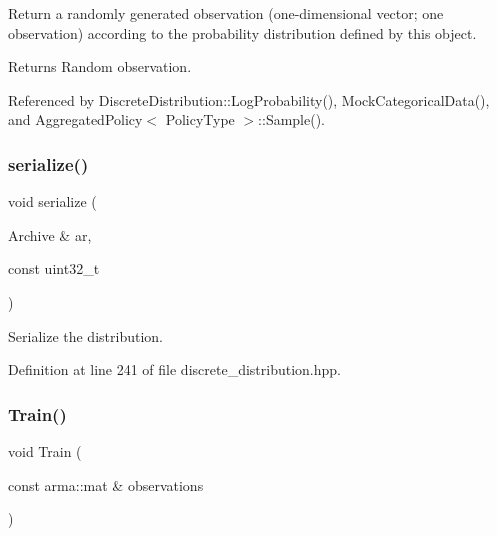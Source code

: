 Return a randomly generated observation (one-\/dimensional vector; one observation) according to the probability distribution defined by this object. 

\begin{DoxyReturn}{Returns}
Random observation. 
\end{DoxyReturn}


Referenced by Discrete\+Distribution\+::\+Log\+Probability(), Mock\+Categorical\+Data(), and Aggregated\+Policy$<$ Policy\+Type $>$\+::\+Sample().

\mbox{\label{classmlpack_1_1distribution_1_1DiscreteDistribution_a65cba07328997659bec80b9879b15a51}} 
\subsubsection{serialize()}
{\footnotesize\ttfamily void serialize (\begin{DoxyParamCaption}\item[{Archive \&}]{ar,  }\item[{const uint32\+\_\+t}]{ }\end{DoxyParamCaption})\hspace{0.3cm}{\ttfamily [inline]}}



Serialize the distribution. 



Definition at line 241 of file discrete\+\_\+distribution.\+hpp.

\mbox{\label{classmlpack_1_1distribution_1_1DiscreteDistribution_a269c6f8a40ce41a5f7b6d035aef58238}} 
\subsubsection{Train()\hspace{0.1cm}{\footnotesize\ttfamily [1/2]}}
{\footnotesize\ttfamily void Train (\begin{DoxyParamCaption}\item[{const arma\+::mat \&}]{observations }\end{DoxyParamCaption})}



